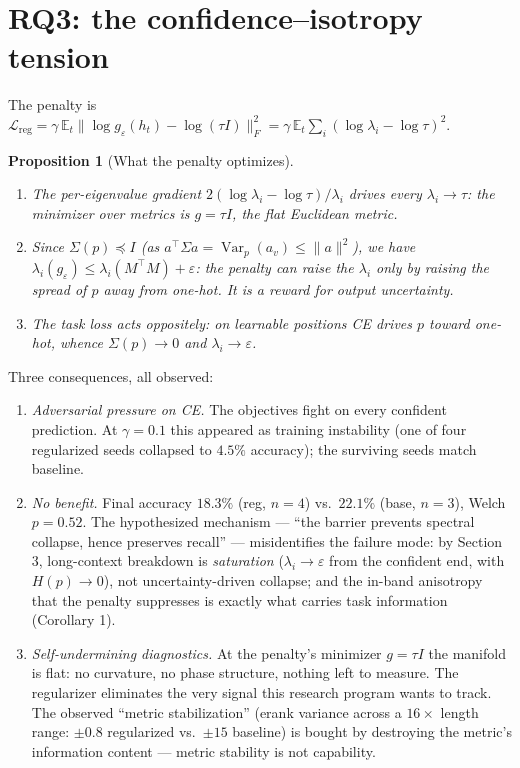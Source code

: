 \documentclass[11pt,a4paper]{article}
\newtheorem{prop}{Proposition}
\theoremstyle{definition}
\theoremstyle{remark}
\begin{document}
\section{RQ3: the confidence--isotropy tension}

The penalty is
$\mathcal{L}_{\mathrm{reg}} = \gamma\,\mathbb{E}_t\big\|\log g_\varepsilon(h_t) - \log(\tau
I)\big\|_F^2 = \gamma\,\mathbb{E}_t\sum_i (\log \lambda_i - \log \tau)^2$.

\begin{prop}[What the penalty optimizes]
\mbox{}\phantom{}
\begin{enumerate}
\item[(i)] The per-eigenvalue gradient $2(\log \lambda_i - \log\tau)/\lambda_i$ drives every
$\lambda_i \to \tau$: the minimizer over metrics is $g = \tau I$, the flat Euclidean metric.
\item[(ii)] Since $\Sigma(p) \preceq I$ (as $a^\top \Sigma a = \operatorname{Var}_p(a_v) \le
\|a\|^2$), we have $\lambda_i(g_\varepsilon) \le \lambda_i(M^\top M) + \varepsilon$: the penalty
can raise the $\lambda_i$ only by raising the spread of $p$ away from one-hot. It is a \emph{reward
for output uncertainty}.
\item[(iii)] The task loss acts oppositely: on learnable positions CE drives $p$ toward one-hot,
whence $\Sigma(p) \to 0$ and $\lambda_i \to \varepsilon$.
\end{enumerate}
\end{prop}

Three consequences, all observed:
\begin{enumerate}
\item \emph{Adversarial pressure on CE.} The objectives fight on every confident prediction. At
$\gamma = 0.1$ this appeared as training instability (one of four regularized seeds collapsed to
$4.5\%$ accuracy); the surviving seeds match baseline.
\item \emph{No benefit.} Final accuracy $18.3\%$ (reg, $n{=}4$) vs.\ $22.1\%$ (base, $n{=}3$),
Welch $p = 0.52$. The hypothesized mechanism --- ``the barrier prevents spectral collapse, hence
preserves recall'' --- misidentifies the failure mode: by Section 3, long-context breakdown is
\emph{saturation} ($\lambda_i \to \varepsilon$ from the confident end, with $H(p) \to 0$), not
uncertainty-driven collapse; and the in-band anisotropy that the penalty suppresses is exactly
what carries task information (Corollary 1).
\item \emph{Self-undermining diagnostics.} At the penalty's minimizer $g = \tau I$ the manifold is
flat: no curvature, no phase structure, nothing left to measure. The regularizer eliminates the
very signal this research program wants to track. The observed ``metric stabilization'' (erank
variance across a $16\times$ length range: $\pm 0.8$ regularized vs.\ $\pm 15$ baseline) is bought
by destroying the metric's information content --- metric stability is not capability.
\end{enumerate}
\end{document}
